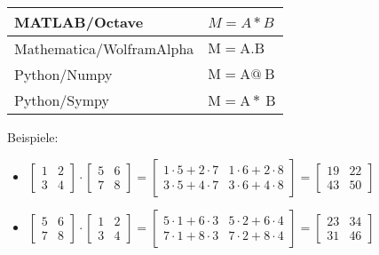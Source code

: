 \documentclass[10pt]{article}
\begin{document}
\begin{center}
\begin{tabular}{|l|l|}
\hline
MATLAB/Octave & $M=A * B$ \\
\hline
Mathematica/WolframAlpha & $\mathrm{M}=\mathrm{A} . \mathrm{B}$ \\
\hline
Python/Numpy & $\mathrm{M}=\mathrm{A} @ \mathrm{~B}$ \\
\hline
Python/Sympy & $\mathrm{M}=\mathrm{A} * \mathrm{~B}$ \\
\hline
\end{tabular}
\end{center}

Beispiele:

\begin{itemize}
  \item $\left[\begin{array}{ll}1 & 2 \\ 3 & 4\end{array}\right] \cdot\left[\begin{array}{ll}5 & 6 \\ 7 & 8\end{array}\right]=\left[\begin{array}{ll}1 \cdot 5+2 \cdot 7 & 1 \cdot 6+2 \cdot 8 \\ 3 \cdot 5+4 \cdot 7 & 3 \cdot 6+4 \cdot 8\end{array}\right]=\left[\begin{array}{ll}19 & 22 \\ 43 & 50\end{array}\right]$
  \item $\left[\begin{array}{ll}5 & 6 \\ 7 & 8\end{array}\right] \cdot\left[\begin{array}{ll}1 & 2 \\ 3 & 4\end{array}\right]=\left[\begin{array}{ll}5 \cdot 1+6 \cdot 3 & 5 \cdot 2+6 \cdot 4 \\ 7 \cdot 1+8 \cdot 3 & 7 \cdot 2+8 \cdot 4\end{array}\right]=\left[\begin{array}{ll}23 & 34 \\ 31 & 46\end{array}\right]$
\end{itemize}
\end{document}
